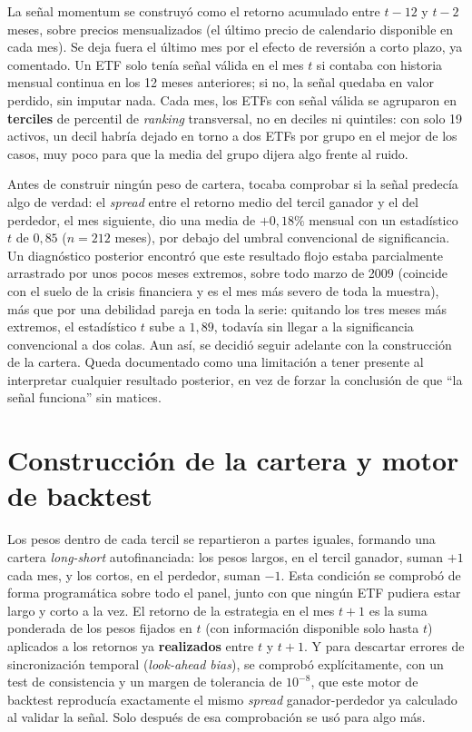\documentclass[12pt]{report} %
\begin{document}
La señal momentum se construyó como el retorno acumulado entre $t-12$ y $t-2$ meses, sobre precios mensualizados (el último precio de calendario disponible en cada mes). Se deja fuera el último mes por el efecto de reversión a corto plazo, ya comentado. Un ETF solo tenía señal válida en el mes $t$ si contaba con historia mensual continua en los 12 meses anteriores; si no, la señal quedaba en valor perdido, sin imputar nada. Cada mes, los ETFs con señal válida se agruparon en \textbf{terciles} de percentil de \textit{ranking} transversal, no en deciles ni quintiles: con solo 19 activos, un decil habría dejado en torno a dos ETFs por grupo en el mejor de los casos, muy poco para que la media del grupo dijera algo frente al ruido.

Antes de construir ningún peso de cartera, tocaba comprobar si la señal predecía algo de verdad: el \textit{spread} entre el retorno medio del tercil ganador y el del perdedor, el mes siguiente, dio una media de $+0{,}18\%$ mensual con un estadístico $t$ de $0{,}85$ ($n=212$ meses), por debajo del umbral convencional de significancia. Un diagnóstico posterior encontró que este resultado flojo estaba parcialmente arrastrado por unos pocos meses extremos, sobre todo marzo de 2009 (coincide con el suelo de la crisis financiera y es el mes más severo de toda la muestra), más que por una debilidad pareja en toda la serie: quitando los tres meses más extremos, el estadístico $t$ sube a $1{,}89$, todavía sin llegar a la significancia convencional a dos colas. Aun así, se decidió seguir adelante con la construcción de la cartera. Queda documentado como una limitación a tener presente al interpretar cualquier resultado posterior, en vez de forzar la conclusión de que ``la señal funciona'' sin matices.

\section{Construcción de la cartera y motor de backtest}

Los pesos dentro de cada tercil se repartieron a partes iguales, formando una cartera \textit{long-short} autofinanciada: los pesos largos, en el tercil ganador, suman $+1$ cada mes, y los cortos, en el perdedor, suman $-1$. Esta condición se comprobó de forma programática sobre todo el panel, junto con que ningún ETF pudiera estar largo y corto a la vez. El retorno de la estrategia en el mes $t+1$ es la suma ponderada de los pesos fijados en $t$ (con información disponible solo hasta $t$) aplicados a los retornos ya \textbf{realizados} entre $t$ y $t+1$. Y para descartar errores de sincronización temporal (\textit{look-ahead bias}), se comprobó explícitamente, con un test de consistencia y un margen de tolerancia de $10^{-8}$, que este motor de backtest reproducía exactamente el mismo \textit{spread} ganador-perdedor ya calculado al validar la señal. Solo después de esa comprobación se usó para algo más.
\end{document}
